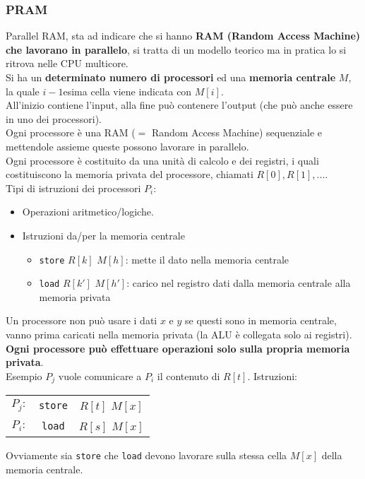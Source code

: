 \newpage

\subsubsection{PRAM}
\label{subsubsec:PRAM}
Parallel RAM, sta ad indicare che si hanno \textbf{RAM (Random Access Machine) che lavorano in parallelo}, si tratta di un modello teorico ma in pratica lo si ritrova nelle CPU multicore.\\

Si ha un \textbf{determinato numero di processori} ed una \textbf{memoria centrale} $M$, la quale $i-1$esima cella viene indicata con $M[i]$.\\
All'inizio contiene l'input, alla fine può contenere l'output (che può anche essere in uno dei processori).\\

Ogni processore è una RAM ($=$ Random Access Machine) sequenziale e mettendole assieme queste possono lavorare in parallelo.\\
Ogni processore è costituito da una unità di calcolo e dei registri, i quali costituiscono la memoria privata del processore, chiamati $R[0], R[1], ...$.\\

Tipi di istruzioni dei processori $P_i$:
\begin{itemize}
	\item Operazioni aritmetico/logiche.\\
	
	\item Istruzioni da/per la memoria centrale
	\begin{itemize}
		\item  \texttt{store} $R[k]$ $M[h]$: mette il dato nella memoria centrale 
		\item \texttt{load} $R[k']$ $M[h']$: carico nel registro dati dalla memoria centrale alla memoria privata
	\end{itemize}
\end{itemize}
Un processore non può usare i dati $x$ e $y$ se questi sono in memoria centrale, vanno prima caricati nella memoria privata (la ALU è collegata solo ai registri). \textbf{Ogni processore può effettuare operazioni solo sulla propria memoria privata}.\\

Esempio $P_j$ vuole comunicare a $P_i$ il contenuto di $R[t]$. Istruzioni: 
\begin{center}
	\begin{tabular}{c c c}
		$P_j:$ & \texttt{store} & $R[t]$ $M[x]$ \\
		$P_i:$ & \texttt{load} & $R[s]$ $M[x]$
	\end{tabular}
\end{center}
Ovviamente sia \texttt{store} che \texttt{load} devono lavorare sulla stessa cella $M[x]$ della memoria centrale. \\


